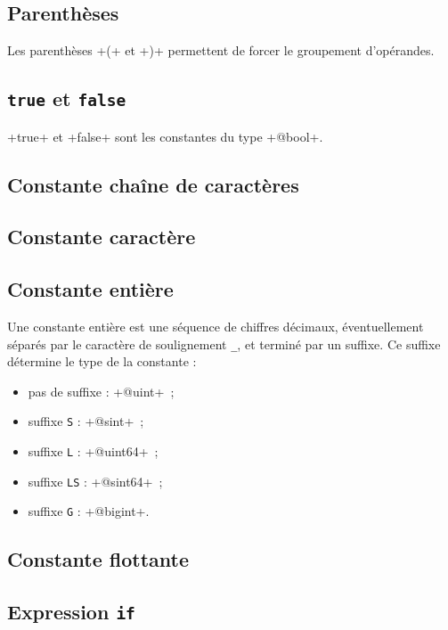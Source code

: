 \subsection{Parenthèses}

Les parenthèses \ggs+(+ et \ggs+)+ permettent de forcer le groupement d'opérandes.






\subsection{\texttt{true} et \texttt{false}}

\ggs+true+ et \ggs+false+ sont les constantes du type \ggs+@bool+.

\subsection{Constante chaîne de caractères}

\subsection{Constante caractère}

\subsection{Constante entière}

Une constante entière est une séquence de chiffres décimaux, éventuellement séparés par le caractère de soulignement \texttt{\_}, et terminé par un suffixe. Ce suffixe détermine le type de la constante :
\begin{itemize}
  \item pas de suffixe : \ggs+@uint+~;
  \item suffixe \texttt{S} : \ggs+@sint+~;
  \item suffixe \texttt{L} : \ggs+@uint64+~;
  \item suffixe \texttt{LS} : \ggs+@sint64+~;
  \item suffixe \texttt{G} : \ggs+@bigint+.
\end{itemize}

\subsection{Constante flottante}

\subsection{Expression \texttt{if}}

